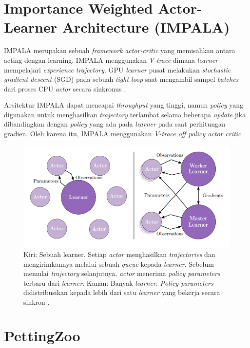 \section{Importance Weighted Actor-Learner Architecture (IMPALA)}

IMPALA merupakan sebuah \emph{framework} \emph{actor-critic} yang memisahkan antara acting dengan learning.
IMPALA menggunakan \emph{V-trace} dimana \emph{learner} mempelajari \emph{experience trajectory}.
GPU \emph{learner} pusat melakukan \emph{stochastic gradient descent} (SGD) pada sebuah \emph{tight loop} saat mengambil sampel 
\emph{batches} dari proses CPU \emph{actor} secara sinkronus \citep{impala}.

Arsitektur IMPALA dapat mencapai \emph{throughput} yang tinggi, namun \emph{policy} yang digunakan untuk menghasilkan \emph{trajectory} terlambat selama beberapa \emph{update} jika dibandingkan dengan \emph{policy} yang ada pada \emph{learner} pada saat perhitungan gradien.
Oleh karena itu, IMPALA menggunakan \emph{V-trace off policy actor critic}

\begin{figure}[H]
  \centering
    \includegraphics[scale=0.8]{gambar/impala_worker.png}
    \caption{Kiri: Sebuah learner. Setiap \emph{actor} menghasilkan \emph{trajectories} dan mengirimkannya melalui sebuah \emph{queue} kepada \emph{learner}.
    Sebelum memulai \emph{trajectory} selanjutnya, \emph{actor} menerima \emph{policy parameters} terbaru dari \emph{learner}.
    Kanan: Banyak \emph{learner}. \emph{Policy parameters} didistribusikan kepada lebih dari satu \emph{learner} yang bekerja secara sinkron \citep{impala}.}
    \label{fig:impalaSingleVsMultipleLearner}
\end{figure}

\section{PettingZoo}

